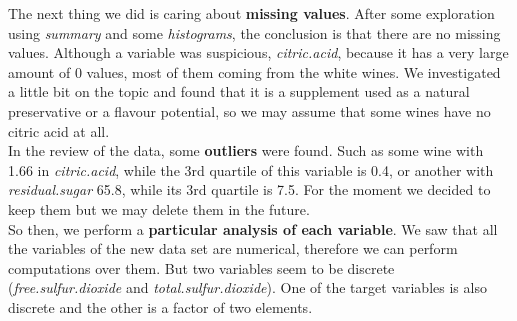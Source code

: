 \documentclass[10pt]{article}
\begin{document}
The next thing we did is caring about \textbf{missing values}. After some exploration using \textit{summary} and some \textit{histograms}, the conclusion is that there are no missing values. Although a variable was suspicious, \textit{citric.acid}, because it has a very large amount of 0 values, most of them coming from the white wines. We investigated a little bit on the topic and found that it is a supplement used as a natural preservative or a flavour potential, so we may assume that some wines have no citric acid at all. \\

In the review of the data, some \textbf{outliers} were found. Such as some wine with 1.66 in \textit{citric.acid}, while the 3rd quartile of this variable is 0.4, or another with \textit{residual.sugar} 65.8, while its 3rd quartile is 7.5. For the moment we decided to keep them but we may delete them in the future. \\

So then, we perform a \textbf{particular analysis of each variable}. We saw that all the variables of the new data set are numerical, therefore we can perform computations over them. But two variables seem to be discrete (\textit{free.sulfur.dioxide} and \textit{total.sulfur.dioxide}). One of the target variables is also discrete and the other is a factor of two elements. \\
\end{document}

